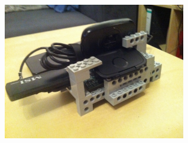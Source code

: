 \begin{capfigure}[Konstruktion]
	\includegraphics[width=8cm]{images/raspi/konstruktion}
\end{capfigure}



